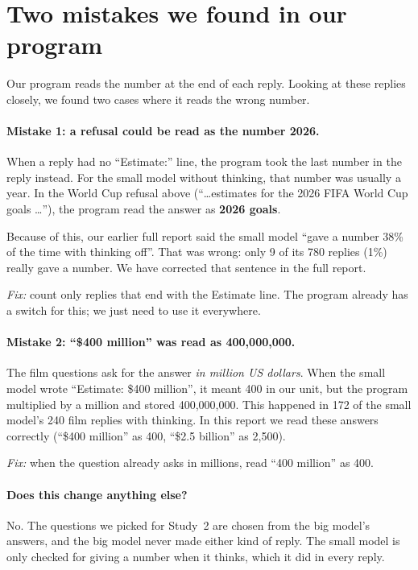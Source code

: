 \documentclass[11pt,a4paper]{article}
\begin{document}
\section{Two mistakes we found in our program}
\label{sec:mistakes}

Our program reads the number at the end of each reply. Looking at these replies closely, we found two cases where it reads the wrong number.

\paragraph{Mistake 1: a refusal could be read as the number 2026.} When a reply had no ``Estimate:'' line, the program took the last number in the reply instead. For the small model without thinking, that number was usually a year. In the World Cup refusal above (``\dots estimates for the 2026 FIFA World Cup goals \dots''), the program read the answer as \textbf{2026 goals}.

Because of this, our earlier full report said the small model ``gave a number 38\% of the time with thinking off''. That was wrong: only 9 of its 780 replies (1\%) really gave a number. We have corrected that sentence in the full report.

\emph{Fix:} count only replies that end with the Estimate line. The program already has a switch for this; we just need to use it everywhere.

\paragraph{Mistake 2: ``\$400 million'' was read as 400,000,000.} The film questions ask for the answer \emph{in million US dollars}. When the small model wrote ``Estimate: \$400 million'', it meant 400 in our unit, but the program multiplied by a million and stored 400,000,000. This happened in 172 of the small model's 240 film replies with thinking. In this report we read these answers correctly (``\$400 million'' as 400, ``\$2.5 billion'' as 2,500).

\emph{Fix:} when the question already asks in millions, read ``400 million'' as 400.

\paragraph{Does this change anything else?} No. The questions we picked for Study~2 are chosen from the big model's answers, and the big model never made either kind of reply. The small model is only checked for giving a number when it thinks, which it did in every reply.
\end{document}
